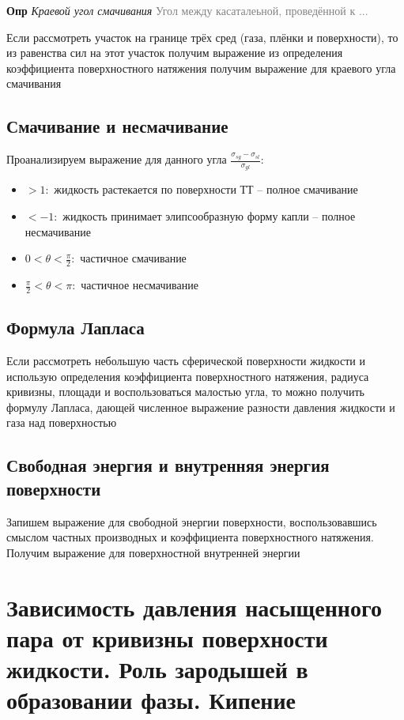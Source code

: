 \documentclass[a4paper, 14pt]{article}
\begin{document}
    \textbf{Опр} \textit{Краевой угол смачивания} \textcolor{gray}{Угол между касаталеьной, проведённой к ...}
    
    Если рассмотреть участок на границе трёх сред (газа, плёнки и поверхности), то из равенства сил на этот участок
    получим выражение из определения коэффициента поверхностного натяжения получим выражение для краевого угла
    смачивания
    
    \subsection{Смачивание и несмачивание}
    
    Проанализируем выражение для данного угла $\frac{\sigma_{sg} - \sigma_{sl}}{\sigma_{gl}}$:
    \begin{itemize}
        \item $> 1:$ жидкость растекается по поверхности ТТ -- полное смачивание
        \item $<-1:$ жидкость принимает элипсообразную форму капли -- полное несмачивание
        \item $0 < \theta < \frac{\pi}{2}:$ частичное смачивание
        \item $\frac{\pi}{2} < \theta < \pi:$ частичное несмачивание
    \end{itemize}
    
    \subsection{Формула Лапласа}
    
    Если рассмотреть небольшую часть сферической поверхности жидкости и использую определения коэффициента
    поверхностного натяжения, радиуса кривизны, площади и воспользоваться малостью угла, то можно получить формулу
    Лапласа, дающей численное выражение разности давления жидкости и газа над поверхностью
    
    \subsection{Свободная энергия и внутренняя энергия поверхности}
    
    Запишем выражение для свободной энергии поверхности, воспользовавшись смыслом частных производных и коэффициента
    поверхностного натяжения.
    Получим выражение для поверхностной внутренней энергии
    
    \section{Зависимость давления насыщенного пара от кривизны поверхности жидкости.
    Роль зародышей в образовании фазы.
    Кипение}
    
\end{document}
